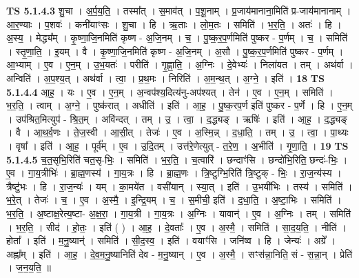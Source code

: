 \documentclass[17pt]{extarticle}
\begin{document}
                  \newline
                                \textbf{ TS 5.1.4.3} \newline
                  शु॒चा । अ॒र्प॒य॒ति॒ । तस्मा᳚त् । स॒माव॑त् । प॒शू॒नाम् । प्र॒जाय॑मानाना॒मिति॑ प्र-जाय॑मानानाम् । आ॒र॒ण्याः । प॒शवः॑ । कनी॑याꣳसः । शु॒चा । हि । ऋ॒ताः । लो॒म॒तः । समिति॑ । भ॒र॒ति॒ । अतः॑ । हि । अ॒स्य॒ । मेद्ध्य᳚म् । कृ॒ष्णा॒जि॒नमिति॑ कृष्ण - अ॒जि॒नम् । च॒ । पु॒ष्क॒र॒प॒र्णमिति॑ पुष्कर - प॒र्णम् । च॒ । समिति॑ । स्तृ॒णा॒ति॒ । इ॒यम् । वै । कृ॒ष्णा॒जि॒नमिति॑ कृष्ण - अ॒जि॒नम् । अ॒सौ । पु॒ष्क॒र॒प॒र्णमिति॑ पुष्कर - प॒र्णम् । आ॒भ्याम् । ए॒व । ए॒न॒म् । उ॒भ॒यतः॑ । परीति॑ । गृ॒ह्णा॒ति॒ । अ॒ग्निः । दे॒वेभ्यः॑ । निला॑यत । तम् । अथ॑र्वा । अन्विति॑ । अ॒प॒श्य॒त् । अथ॑र्वा । त्वा॒ । प्र॒थ॒मः । निरिति॑ । अ॒म॒न्थ॒त् । अ॒ग्ने॒ । इति॑ । \textbf{  18} \newline
                  \newline
                                \textbf{ TS 5.1.4.4} \newline
                  आ॒ह॒ । यः । ए॒व । ए॒न॒म् । अ॒न्वप॑श्य॒दित्य॑नु-अप॑श्यत् । तेन॑ । ए॒व । ए॒न॒म् । समिति॑ । भ॒र॒ति॒ । त्वाम् । अ॒ग्ने॒ । पुष्क॑रात् । अधीति॑ । इति॑ । आ॒ह॒ । पु॒ष्क॒रप॒र्ण इति॑ पुष्कर - प॒र्णे । हि । ए॒न॒म् । उप॑श्रित॒मित्युप॑ - श्रि॒त॒म् । अवि॑न्दत् । तम् । उ॒ । त्वा॒ । द॒द्ध्यङ् । ऋषिः॑ । इति॑ । आ॒ह॒ । द॒द्ध्यङ् । वै । आ॒थ॒र्व॒णः । ते॒ज॒स्वी । आ॒सी॒त् । तेजः॑ । ए॒व । अ॒स्मि॒न्न् । द॒धा॒ति॒ । तम् । उ॒ । त्वा॒ । पा॒थ्यः । वृषा᳚ । इति॑ । आ॒ह॒ । पूर्व᳚म् । ए॒व । उ॒दि॒तम् । उत्त॑रे॒णेत्युत् - त॒रे॒ण॒ । अ॒भीति॑ । गृ॒णा॒ति॒ । \textbf{  19} \newline
                  \newline
                                \textbf{ TS 5.1.4.5} \newline
                  च॒त॒सृभि॒रिति॑ चत॒सृ-भिः॒ । समिति॑ । भ॒र॒ति॒ । च॒त्वारि॑ । छन्दाꣳ॑सि । छन्दो॑भि॒रिति॒ छन्दः॑-भिः॒ । ए॒व । गा॒य॒त्रीभिः॑ । ब्रा॒ह्म॒णस्य॑ । गा॒य॒त्रः । हि । ब्रा॒ह्म॒णः । त्रि॒ष्टुग्भि॒रिति॑ त्रि॒ष्टुक् - भिः॒ । रा॒ज॒न्य॑स्य । त्रैष्टु॑भः । हि । रा॒ज॒न्यः॑ । यम् । का॒मये॑त । वसी॑यान् । स्या॒त् । इति॑ । उ॒भयी॑भिः । तस्य॑ । समिति॑ । भ॒रे॒त् । तेजः॑ । च॒ । ए॒व । अ॒स्मै॒ । इ॒न्द्रि॒यम् । च॒ । स॒मीची॒ इति॑ । द॒धा॒ति॒ । अ॒ष्टा॒भिः । समिति॑ । भ॒र॒ति॒ । अ॒ष्टाक्ष॒रेत्य॒ष्टा- अ॒क्ष॒रा॒ । गा॒य॒त्री । गा॒य॒त्रः । अ॒ग्निः । यावान्॑ । ए॒व । अ॒ग्निः । तम् । समिति॑ । भ॒र॒ति॒ । सीद॑ । हो॒तः॒ । इति॑ ( ) । आ॒ह॒ । दे॒वताः᳚ । ए॒व । अ॒स्मै॒ । समिति॑ । सा॒द॒य॒ति॒ । नीति॑ । होता᳚ । इति॑ । म॒नु॒ष्यान्॑ । समिति॑ । सी॒द॒स्व॒ । इति॑ । वयाꣳ॑सि । जनि॑ष्व । हि । जेन्यः॑ । अग्रे᳚ । अह्ना᳚म् । इति॑ । आ॒ह॒ । दे॒व॒म॒नु॒ष्यानिति॑ देव - म॒नु॒ष्यान् । ए॒व । अ॒स्मै॒ । सꣳस॑न्ना॒निति॒ सं - स॒न्ना॒न् । प्रेति॑ । ज॒न॒य॒ति॒ ॥ \textbf{ } \newline
\end{document}

